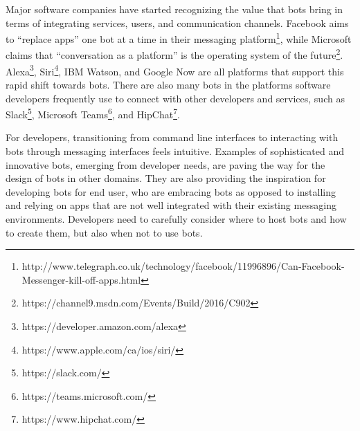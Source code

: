 \documentclass{sig-alternate}
\newcommand{\cp}[1]{\textcolor{red}{{\it [Cassie says: #1]}}}
\begin{document}
Major software companies have started recognizing the value that bots bring in terms of integrating services, users, and communication channels. Facebook aims to ``replace apps'' one bot at a time in their messaging platform\footnote{http://www.telegraph.co.uk/technology/facebook/11996896/Can-Facebook-Messenger-kill-off-apps.html}, while Microsoft claims that ``conversation as a platform'' is the operating system of the future\footnote{https://channel9.msdn.com/Events/Build/2016/C902}. 
Alexa\footnote{https://developer.amazon.com/alexa\label{Alexa}}, Siri\footnote{https://www.apple.com/ca/ios/siri/\label{Siri}}, IBM Watson, and Google Now
are all platforms that support this rapid shift towards bots. 
There are also many bots in the platforms software developers frequently use to connect with other developers and services, such as Slack\footnote{https://slack.com/\label{Slack}}, Microsoft Teams\footnote{https://teams.microsoft.com/\label{Teams}}, and HipChat\footnote{https://www.hipchat.com/\label{Hipchat}}. 


For developers, transitioning from command line interfaces to interacting with bots through messaging interfaces feels intuitive.
Examples of sophisticated and innovative bots, emerging from developer needs, are paving the way for the design of bots in other domains. 
They are also providing the inspiration for developing bots for end user, who are embracing bots as opposed to installing and relying on apps that are not well integrated with their existing messaging environments.
Developers need to carefully consider where to host bots and how to create them, but also when not to use bots. 
\end{document}
